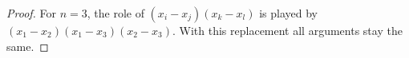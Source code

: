 \documentclass[11pt]{amsart}
\theoremstyle{definition}
\newcommand{\CC}{\mathbb{C}}
\newcommand{\mm}{\mathfrak{m}}
\begin{document}
\begin{proof}
For $n = 3$, the role of $(x_i-x_j)(x_k-x_l)$ is played by $(x_1-x_2)(x_1-x_3)(x_2-x_3)$. With this replacement all arguments stay the same.
\end{proof}


\end{document}
